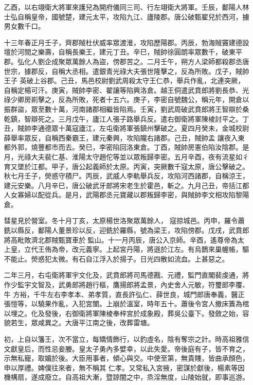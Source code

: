 \begin{pinyinscope}
 乙酉，以右翊衛大將軍來護兒為開府儀同三司、行左翊衛大將軍。壬辰，鄱陽人林士弘自稱皇帝，國號楚，建元太平，攻陷九江、廬陵郡。唐公破甄翟兒於西河，擄男女數千口。



 十三年春正月壬子，齊郡賊杜伏威率眾渡淮，攻陷歷陽郡。丙辰，勃海賊竇建德設壇於河間之樂壽，自稱長樂王，建元丁丑。辛巳，賊帥徐圓朗率眾數千，破東平郡。弘化人劉企成聚眾萬餘人為盜，傍郡苦之。二月壬午，朔方人梁師都殺郡丞唐世宗，據郡反，自稱大丞相。遣銀青光祿大夫張世隆擊之，反為所敗。戊子，賊帥王子
 英破上谷郡。己丑，馬邑校尉劉武周殺太守王仁恭，舉兵作亂，北連突厥，自稱定楊可汗。庚寅，賊帥李密、翟讓等陷興洛倉。越王侗遣武賁郎將劉長恭、光祿少卿房崱擊之，反為所敗，死者十五六。庚子，李密自號魏公，稱元年，開倉以振群盜，眾至數十萬，河南諸郡相繼皆陷焉。壬寅，劉武周破武賁郎將王智辯於桑乾鎮，智辯死之。三月戊午，廬江人張子路舉兵反。遣右御衛將軍陳棱討平之。丁丑，賊帥李通德眾十萬寇廬江，左屯衛將軍張鎮州擊破之。夏四月癸未，金城校尉薛舉率眾反，自稱西秦霸王，建元秦興，攻陷隴右諸郡。己丑，賊帥孟
 讓夜入東都外郭，燒豐都市而去。癸巳，李密陷回洛東倉。丁酉，賊帥房憲伯陷汝陰郡。是月，光祿大夫裴仁基、淮陽太守趙佗等並以眾叛歸李密。五月辛酉，夜有流星如彳育又墜於江都。甲子，唐公起義師於太原。丙寅，突厥數千寇太原，唐公擊破之。秋七月壬子，熒惑守積尸。丙辰，武威人李軌舉兵反，攻陷河西諸郡，自稱涼王，建元安樂。八月辛巳，唐公破武牙郎將宋老生於霍邑，斬之。九月己丑，帝括江都人女寡婦以配從兵。是月，武陽郡丞元寶藏以郡叛歸李密，與賊帥李文相攻陷黎陽倉。



 彗星見於營室。冬十月丁亥，太原楊世洛聚眾萬餘人，
 寇掠城邑。丙申，羅令蕭銑以縣反，鄱陽人董景珍以反，迎銑於羅縣，號為梁王，攻陷傍郡。戊戌，武賁郎將高毗敗濟北郡賊甄寶車於監山。十一月丙辰，唐公入京師。辛酉，遙尊帝為太上皇，立代王侑為帝，改元義寧。上起宮丹陽，將遜於江左。有烏鵲來巢幄帳，驅不能止。熒惑犯太微。有石自江浮入於揚子。日光四散如流血。上甚惡之。



 二年三月，右屯衛將軍宇文化及，武賁郎將司馬德戡、元禮，監門直閣裴虔通，將作少監宇文智及，武勇郎將趙行樞，鷹揚郎將孟景，內史舍人元敏，符璽郎李覆、牛
 方裕，千牛左右李孝本、弟孝質，直長許弘仁、薛世良，城門郎唐奉義，醫正張愷等，以驍果作亂，入犯宮闈。上崩於溫室，時年五十。蕭後令宮人撤床簀為棺以埋之。化及發後，右御衛將軍陳棱奉梓宮於成象殿，葬吳公臺下。發斂之始，容貌若生，眾咸異之。大唐平江南之後，改葬雷塘。



 初，上自以籓王，次不當立，每矯情飾行，以釣虛名，陰有奪宗之計。時高祖雅信文獻皇后，而性忌妾媵。皇太子勇內多嬖幸，以此失愛。帝後庭有子，皆不育之，示無私寵，取媚於後。大臣用事者，傾心與交。中使至第，無貴賤，皆曲承顏色，申以厚禮。婢僕往來者，無不稱其
 仁孝。又常私入宮掖，密謀於獻後，楊素等因機構扇，遂成廢立。自高祖大漸，暨諒闇之中，烝淫無度，山陵始就，即事巡游。




\end{pinyinscope}
